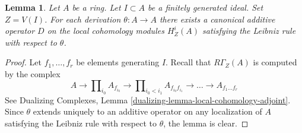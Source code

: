 \documentclass[10pt,a4paper]{amsart}
\theoremstyle{plain}
\newtheorem{lemma}[subsection]{Lemma}
\theoremstyle{definition}
\theoremstyle{remark}
\numberwithin{equation}{subsection}
\begin{document}
\begin{lemma}
\label{lemma-derivation}
Let $A$ be a ring. Let $I \subset A$ be a finitely generated ideal.
Set $Z = V(I)$.
For each derivation $\theta : A \to A$ there exists a canonical
additive operator $D$ on the local cohomology modules
$H^i_Z(A)$ satisfying the Leibniz rule with respect to $\theta$.
\end{lemma}

\begin{proof}
Let $f_1, \ldots, f_r$ be elements generating $I$.
Recall that $R\Gamma_Z(A)$ is computed by the complex
$$
A \to \prod\nolimits_{i_0} A_{f_{i_0}} \to
\prod\nolimits_{i_0 < i_1} A_{f_{i_0}f_{i_1}}
\to \ldots \to A_{f_1\ldots f_r}
$$
See Dualizing Complexes, Lemma \ref{dualizing-lemma-local-cohomology-adjoint}.
Since $\theta$ extends uniquely to an additive operator on
any localization of $A$ satisfying the Leibniz rule with
respect to $\theta$, the lemma is clear.
\end{proof}
\end{document}
